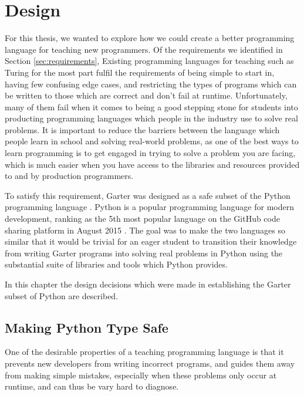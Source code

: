 \glsresetall %
\chapter{Design}\label{ch:Design}

For this thesis, we wanted to explore how we could create a better programming
language for teaching new programmers. Of the requirements we identified in
Section \ref{sec:requirements}, Existing programming languages for teaching such
as Turing \cite{turingpaper} for the most part fulfil the requirements of being
simple to start in, having few confusing edge cases, and restricting the types
of programs which can be written to those which are correct and don't fail at
runtime. Unfortunately, many of them fail when it comes to being a good stepping
stone for students into producting programming languages which people in the
industry use to solve real problems. It is important to reduce the barriers
between the language which people learn in school and solving real-world
problems, as one of the best ways to learn programming is to get engaged in
trying to solve a problem you are facing, which is much easier when you have
access to the libraries and resources provided to and by production programmers.

To satisfy this requirement, Garter was designed as a safe subset of the Python
programming language \cite{pythonweb}. Python is a popular programming language
for modern development, ranking as the 5th most popular language on the GitHub
code sharing platform in August 2015 \cite{githublangs}. The goal was to make
the two languages so similar that it would be trivial for an eager student to
transition their knowledge from writing Garter programs into solving real
problems in Python using the substantial suite of libraries and tools which
Python provides.

In this chapter the design decisions which were made in establishing the Garter
subset of Python are described.

\section{Making Python Type Safe}

One of the desirable properties of a teaching programming language is that it
prevents new developers from writing incorrect programs, and guides them away
from making simple mistakes, especially when these problems only occur at
runtime, and can thus be vary hard to diagnose.

